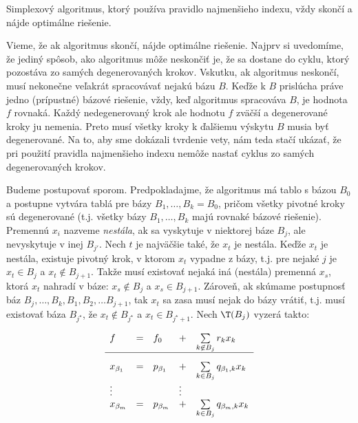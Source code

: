 \begin{veta}
  Simplexový algoritmus, ktorý používa pravidlo najmenšieho indexu, vždy skončí a nájde optimálne riešenie.
\end{veta}

\begin{dokaz}
Vieme, že ak algoritmus skončí, nájde optimálne riešenie. Najprv si uvedomíme, že jediný spôsob, ako algoritmus môže neskončiť je,
že sa dostane do cyklu, ktorý pozostáva zo samých degenerovaných krokov. Vskutku, ak algoritmus neskončí, musí nekonečne veľakrát
spracovávať nejakú bázu $B$. Keďže k $B$ prislúcha práve jedno (prípustné) bázové riešenie, vždy, keď algoritmus spracováva $B$,
je hodnota $f$ rovnaká. Každý nedegenerovaný krok ale hodnotu $f$ zväčší a degenerované kroky ju nemenia. Preto musí všetky kroky
k ďalšiemu výskytu $B$ musia byť degenerované. Na to, aby sme dokázali tvrdenie vety, nám teda stačí ukázať, že pri použití
pravidla najmenšieho indexu nemôže nastať cyklus zo samých degenerovaných krokov.

\noindent
Budeme postupovať sporom. Predpokladajme, že algoritmus má tablo s bázou $B_0$ a postupne vytvára tablá pre bázy $B_1,\ldots,B_k=B_0$,
pričom všetky pivotné kroky sú degenerované (t.j. všetky bázy $B_1,\ldots,B_k$ majú rovnaké bázové riešenie). Premennú $x_i$
nazveme {\em nestála}, ak sa vyskytuje v niektorej báze $B_j$, ale nevyskytuje v inej $B_{j'}$. Nech $t$ je najväčšie také, že $x_t$
je nestála. Keďže $x_t$ je nestála, existuje pivotný krok, v ktorom $x_t$ vypadne z bázy, t.j. pre nejaké $j$ je $x_t\in B_j$ a $x_t\not\in B_{j+1}$. Takže musí  existovať nejaká iná
(nestála) premenná $x_s$, ktorá $x_t$ nahradí v báze: $x_s\not\in B_j$ a $x_s\in B_{j+1}$. Zároveň, ak skúmame postupnosť 
báz $B_j,\ldots,B_k,B_1,B_2,\ldots B_{j+1}$,
tak $x_t$ sa zasa musí nejak do bázy vrátiť, t.j. musí existovať báza $B_{j^\star}$, že $x_t\not\in B_{j^\star}$ a $x_t\in B_{j^\star+1}$.
Nech $\T(B_j)$ vyzerá takto:

\begin{equation}
  \label{LP:bland1}
\begin{array}{lllll}
  f & = & f_0 & + & \sum\limits_{k\not\in B_j} r_kx_k\\[2mm]\hline\rule{0mm}{4ex}
  x_{\beta_1} & = & p_{\beta_1} & + & \sum\limits_{k\in B_j}q_{\beta_1,k}x_k\\
    \vdots    &  & & \vdots\\
  x_{\beta_m} & = & p_{\beta_m} & + & \sum\limits_{k\in B_j}q_{\beta_m,k}x_k\\
\end{array}
\end{equation}


\end{dokaz}
